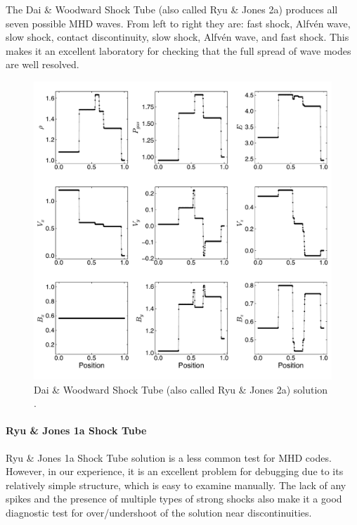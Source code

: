 \documentclass[modern, linenumbers]{aastex631}
\newcommand*{\img}[1]{%
    \raisebox{-.3\baselineskip}{%
        \texttt{[image: \#1]}%
    }%
}
\begin{document}
The Dai \& Woodward Shock Tube (also called Ryu \& Jones 2a) \citep{dai_woodward_1998, ryu_jones_1995} produces all seven possible MHD waves. From left to right they are: fast shock, Alfvén wave, slow shock, contact discontinuity, slow shock, Alfvén wave, and fast shock. This makes it an excellent laboratory for checking that the full spread of wave modes are well resolved.

\begin{figure}[ht!]
    \includegraphics[width=\linewidth]{d&w.pdf}
    \caption{Dai \& Woodward Shock Tube (also called Ryu \& Jones 2a) solution \citep{dai_woodward_1998, ryu_jones_1995}.
    \href{https://github.com/bcaddy/caddy-et-al-2023/blob/4c9c5ef905902e54e50943d0a261bd5b08342225/python/shock-tubes.py}{\img{github.png}}}
    \label{fig:dai-and-woodward}
\end{figure}

\paragraph{Ryu \& Jones 1a Shock Tube}

Ryu \& Jones 1a Shock Tube solution \citep{ryu_jones_1995} is a less common test for MHD codes. However, in our experience, it is an excellent problem for debugging due to its relatively simple structure, which is easy to examine manually. The lack of any spikes and the presence of multiple types of strong shocks also make it a good diagnostic test for over/undershoot of the solution near discontinuities.
\end{document}
